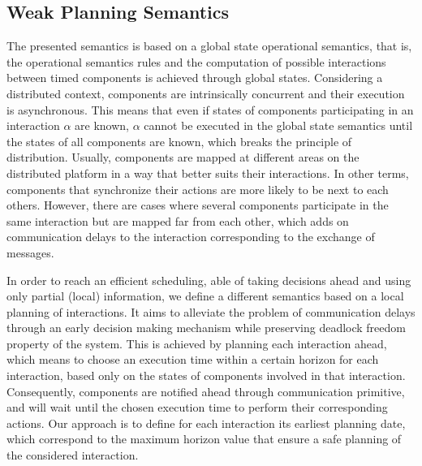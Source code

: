 \subsection{Weak Planning Semantics}

The presented semantics is based on a global state operational semantics, that
is, the operational semantics rules and the computation of possible interactions between
timed components is achieved through global states. 
Considering a distributed context, components are intrinsically concurrent and their execution is asynchronous.
This means that even if states of components participating in 
an interaction $\alpha$ are known, $\alpha$ cannot be executed in the global state semantics until the states of all components are known,
which breaks the principle of distribution.
Usually, components are mapped at different
areas on the distributed platform in a way that better suits their interactions. In other terms,
components that synchronize their actions are more likely to be next to each others. However, there are
cases where several components participate in the same interaction but are mapped far from each other,
which adds on communication delays to the interaction corresponding to the exchange of messages. 

In order to reach an efficient scheduling, able of taking decisions ahead and using only partial (local) information,
we define a different semantics based on
a local planning of interactions. It aims to alleviate the problem of communication delays through
an early decision making mechanism while preserving deadlock freedom property of the system. This is achieved by planning each interaction ahead, which means
to choose an execution time within a certain horizon for each interaction, based only on the states of components involved in that interaction.
Consequently, components are notified ahead through communication primitive,
and will wait until the chosen execution time to perform their corresponding actions.
Our approach is to define for each interaction its earliest planning date, which correspond to the maximum horizon value that ensure
a safe planning of the considered interaction.




